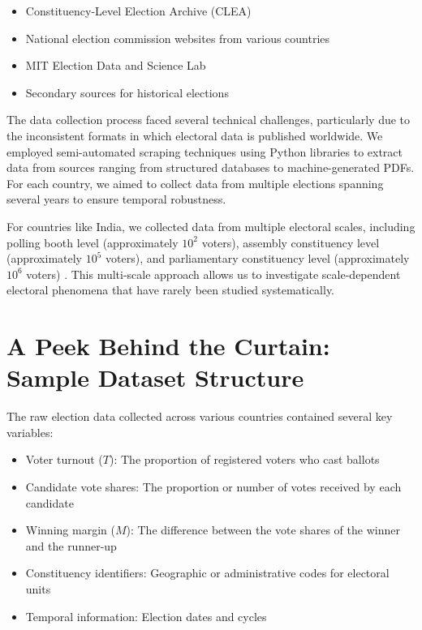 \begin{itemize}
    \item Constituency-Level Election Archive (CLEA) \cite{KliYegHan2012}
    \item National election commission websites from various countries \cite{BorRayBou2012}
    \item MIT Election Data and Science Lab \cite{FerSucRam2014}
    \item Secondary sources for historical elections \cite{ChaMitFor2013}
\end{itemize}

The data collection process faced several technical challenges, particularly due to the inconsistent formats in which electoral data is published worldwide. We employed semi-automated scraping techniques using Python libraries to extract data from sources ranging from structured databases to machine-generated PDFs. For each country, we aimed to collect data from multiple elections spanning several years to ensure temporal robustness.

For countries like India, we collected data from multiple electoral scales, including polling booth level (approximately $10^2$ voters), assembly constituency level (approximately $10^5$ voters), and parliamentary constituency level (approximately $10^6$ voters) \cite{BokSzaVat2018}. This multi-scale approach allows us to investigate scale-dependent electoral phenomena that have rarely been studied systematically.

\section{A Peek Behind the Curtain: Sample Dataset Structure}

The raw election data collected across various countries contained several key variables:
\begin{itemize}
    \item Voter turnout ($T$): The proportion of registered voters who cast ballots
    \item Candidate vote shares: The proportion or number of votes received by each candidate
    \item Winning margin ($M$): The difference between the vote shares of the winner and the runner-up
    \item Constituency identifiers: Geographic or administrative codes for electoral units
    \item Temporal information: Election dates and cycles
\end{itemize}

